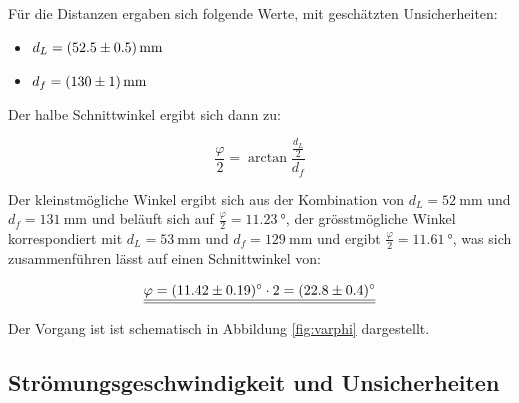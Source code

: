 F\"ur   die  Distanzen   ergaben  sich   folgende  Werte,   mit  gesch\"atzten
Unsicherheiten:

\begin{itemize}
    \item
        $ d_L = \SI{52.5 \pm 0.5}{\milli\meter}$
    \item
        $ d_f = \SI{130 \pm 1}{\milli\meter}$
\end{itemize}

Der halbe Schnittwinkel ergibt sich dann zu:

\begin{equation}
    \label{eq:varphi_half}
    \frac{\varphi}{2} = \arctan \frac{\frac{d_L}{2}}{d_f}
\end{equation}

Der kleinstm\"ogliche Winkel ergibt sich aus der Kombination von
$d_L = \SI{52}{\milli\meter}$
und
$d_f = \SI{131}{\milli\meter}$
und
bel\"auft sich auf
$\frac{\varphi}{2} = \SI{11.23}{\degree}$,
der gr\"osstm\"ogliche Winkel korrespondiert mit
$d_L = \SI{53}{\milli\meter}$
und
$d_f = \SI{129}{\milli\meter}$
und ergibt
$\frac{\varphi}{2} = \SI{11.61}{\degree}$,
was sich zusammenf\"uhren l\"asst auf einen Schnittwinkel von:

\begin{equation}
    \label{eq:varphi_result}
    \underline{\underline{\varphi = \SI{11.42 \pm 0.19}{\degree} \cdot 2 = \SI{22.8 \pm 0.4}{\degree}}}
\end{equation}

Der Vorgang ist ist schematisch in Abbildung \ref{fig:varphi} dargestellt.

\begin{minipage}[t]{\textwidth}
    \centering
    \resizebox{.67\textwidth}{!}{}
    \label{fig:varphi}
\end{minipage}



\clearpage
\subsection{Str\"omungsgeschwindigkeit und Unsicherheiten}
\label{subsec:vUncert}


